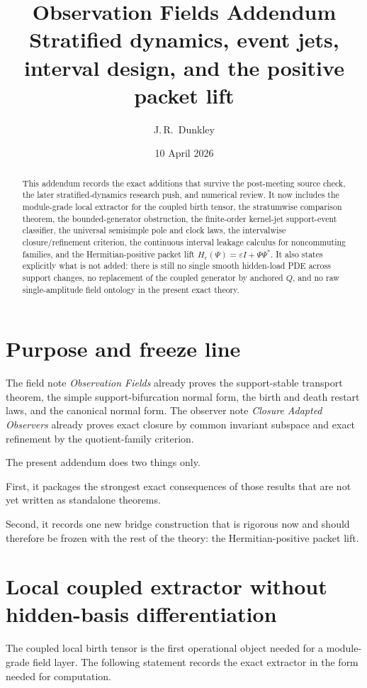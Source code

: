 \documentclass[11pt,a4paper]{article}
\title{\textbf{Observation Fields Addendum}\\
\large{Stratified dynamics, event jets, interval design, and the positive packet lift}}
\author{J.\,R.~Dunkley}
\date{10 April 2026}
\numberwithin{equation}{section}
\theoremstyle{thmcompact}
\theoremstyle{remark}
\begin{document}
\maketitle

\begin{abstract}
This addendum records the exact additions that survive the post-meeting source check, the later stratified-dynamics research push, and numerical review. It now includes the module-grade local extractor for the coupled birth tensor, the stratumwise comparison theorem, the bounded-generator obstruction, the finite-order kernel-jet support-event classifier, the universal semisimple pole and clock laws, the intervalwise closure/refinement criterion, the continuous interval leakage calculus for noncommuting families, and the Hermitian-positive packet lift $H_\varepsilon(\Psi)=\varepsilon I+\Psi\Psi^*$. It also states explicitly what is not added: there is still no single smooth hidden-load PDE across support changes, no replacement of the coupled generator by anchored $Q$, and no raw single-amplitude field ontology in the present exact theory.
\end{abstract}

\section{Purpose and freeze line}

The field note \emph{Observation Fields} already proves the support-stable transport theorem, the simple support-bifurcation normal form, the birth and death restart laws, and the canonical normal form. The observer note \emph{Closure Adapted Observers} already proves exact closure by common invariant subspace and exact refinement by the quotient-family criterion.

The present addendum does two things only.

First, it packages the strongest exact consequences of those results that are not yet written as standalone theorems.

Second, it records one new bridge construction that is rigorous now and should therefore be frozen with the rest of the theory: the Hermitian-positive packet lift.

\section{Local coupled extractor without hidden-basis differentiation}

The coupled local birth tensor is the first operational object needed for a module-grade field layer. The following statement records the exact extractor in the form needed for computation.
\end{document}
